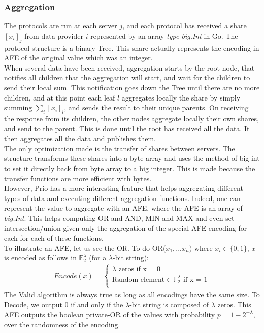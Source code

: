 \documentclass{article}
\begin{document}
\subsubsection*{Aggregation}
The protocols are run at each server $j$, and each protocol has received a share $[x_i]_j$ from data provider $i$ represented by an array \textit{type big.Int} in Go. The protocol structure is a binary Tree.
This share actually represents the encoding in AFE of the original value which was an integer.\\

When several data have been received, aggregation starts by the root node, that notifies all children that the aggregation will start, and wait for the children to send their local sum. This notification goes down the Tree until there are no more children, and at this point each leaf $l$ aggregates locally the share by simply summing $\sum_{i}[x_i]_l$, and sends the result to their unique parents. On receiving the response from its children, the other nodes aggregate locally their own shares, and send to the parent. This is done until the root has received all the data. It then aggregates all the data and publishes them.\\
The only optimization made is the transfer of shares between servers. The structure transforms these shares into a byte array and uses the method of big int to set it directly back from byte array to a big integer. This is made because the transfer functions are more efficient with bytes.\\

However, Prio has a more interesting feature that helps aggregating different types of data and executing different aggregation functions. Indeed, one can represent the value to aggregate with an AFE, where the AFE is an array of \textit{big.Int}. This helps computing OR and AND, MIN and MAX and even set intersection/union given only the aggregation of the special AFE encoding for each for each of these functions.\\
To illustrate an AFE, let us see the OR. To do OR($x_1,...x_n)$ where $x_i \in \{0,1\} $, $x$ is encoded as follows in $\mathbb{F}_2^{\lambda}$ (for a $\lambda$-bit string):
\begin{align*}
    Encode(x)=\left\{
                \begin{array}{ll}
                  \lambda	\text{  zeros}	\text{                                          
                  if x = 0}\\
                  \text{Random element} \in \mathbb{F}^{\lambda}_{2}		\text{											if x = 1}\\
                \end{array}
              \right.
\end{align*}
The Valid algorithm is always true as long as all encodings have the same size. To Decode, we output 0 if and only if the $\lambda$-bit string is composed of $\lambda$ zeros. This AFE outputs the boolean private-OR of the values with probability $p = 1- 2^{-\lambda}$, over the randomness of the encoding.
\end{document}
